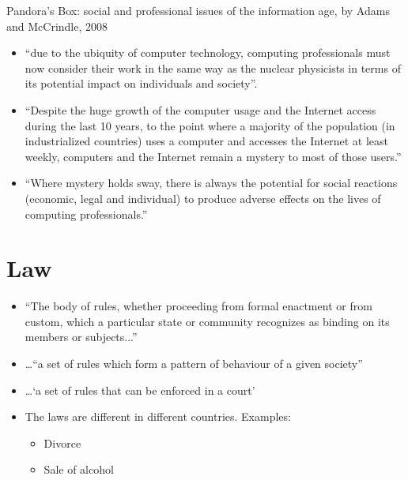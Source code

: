 \documentclass{article}
\begin{document}
Pandora's Box: 
social and professional issues of the information age, 
by Adams and McCrindle, 2008
\begin{itemize}
\item ``due to the ubiquity of computer technology, computing professionals must now consider their work in the same way as the nuclear physicists in terms of its potential impact on individuals and society''.
\item ``Despite the huge growth of the computer usage and the Internet access during the last 10 years, to the point where a majority of the population (in industrialized countries) uses a computer and accesses the Internet at least weekly, computers and the Internet remain a mystery to most of those users.''
\item ``Where mystery holds sway, there is always the potential for social reactions (economic, legal and individual) to produce adverse effects on the lives of computing professionals.''
\end{itemize}



\section{Law}
\begin{itemize}
\item ``The body of rules, whether proceeding from formal enactment or from custom, which a particular state or community recognizes as binding on its members or subjects...'' \cite{oed}
\item \ldots ``a set of rules which form a pattern of behaviour of a given society''
\item \ldots `a set of rules that can be enforced in a court' \cite{shears_james_2005}
\item The laws are different in different countries. Examples:
\begin{itemize}
\item Divorce
\item Sale of alcohol
\end{itemize}
\end{itemize}
\end{document}

